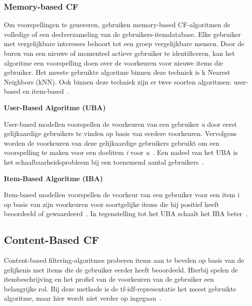 \subsubsection{Memory-based CF}
Om voorspellingen te genereren, gebruiken memory-based CF-algoritmen de volledige of een deelverzameling van de gebruikers-itemdatabase. Elke gebruiker met vergelijkbare interesses behoort tot een groep vergelijkbare mensen. Door de buren van een nieuwe of momenteel actieve gebruiker te identificeren, kan het algoritme een voorspelling doen over de voorkeuren voor nieuwe items die gebruiker. Het meeste gebruikte algoritme binnen deze techniek is k Nearest Neighbors (kNN). Ook binnen deze techniek zijn er twee soorten algoritmen: user-based en item-based~\autocite{Thorat2015}.\par
\medskip
\textbf{User-Based Algoritme (UBA)}\par
User-based modellen voorspellen de voorkeuren van een gebruiker \textit{u} door eerst gelijkaardige gebruikers te vinden op basis van eerdere voorkeuren. Vervolgens worden de voorkeuren van deze gelijkaardige gebruikers gebruikt om een voorspelling te maken voor een doelitem \textit{i} voor \textit{u}~\autocite{Dong2022}. Een nadeel van het UBA is het schaalbaarheidsprobleem bij een toenemend aantal gebruikers~\autocite{Thorat2015}.\par
\medskip
\textbf{Item-Based Algoritme (IBA)}\par
Item-based modellen voorspellen de voorkeur van een gebruiker voor een item i op basis van zijn voorkeuren voor soortgelijke items die hij positief heeft beoordeeld of gewaardeerd~\autocite{Thorat2015,Dong2022}. In tegenstelling tot het UBA schaalt het IBA beter~\autocite{Thorat2015}.

\subsection{Content-Based CF}
Content-based filtering-algoritmes proberen items aan te bevelen op basis van de gelijkenis met items die de gebruiker eerder heeft beoordeeld. Hierbij spelen de itembeschrijving en het profiel van de voorkeuren van de gebruiker een belangrijke rol. Bij deze methode is de tf-idf-representatie het meest gebruikte algoritme, maar hier wordt niet verder op ingegaan~\autocite{Thorat2015}.
